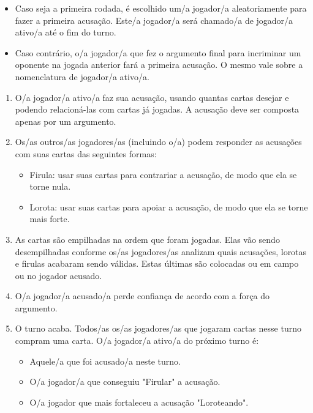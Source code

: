 \documentclass[a4paper, 11pt]{article}
\begin{document}
	\begin{itemize}
		\item Caso seja a primeira rodada, é escolhido um/a jogador/a aleatoriamente para fazer a primeira acusação. Este/a jogador/a será chamado/a de jogador/a ativo/a até o fim do turno.

		\item Caso contrário, o/a jogador/a que fez o argumento final para incriminar um oponente na jogada anterior fará a primeira acusação. O mesmo vale sobre a nomenclatura de jogador/a ativo/a.
	\end{itemize}

	\begin{enumerate}
		\item O/a jogador/a ativo/a faz sua acusação, usando quantas cartas desejar e podendo relacioná-las com cartas já jogadas. A acusação deve ser composta apenas por um argumento.

		\item Os/as outros/as jogadores/as (incluindo o/a) podem responder as acusações com suas cartas das seguintes formas:
			\begin{itemize}
				\item Firula: usar suas cartas para contrariar a acusação, de modo que ela se torne nula.

				\item Lorota: usar suas cartas para apoiar a acusação, de modo que ela se torne mais forte.
			\end{itemize}

		\item As cartas são empilhadas na ordem que foram jogadas. Elas vão sendo desempilhadas conforme os/as jogadores/as analizam quais acusações, lorotas e firulas acabaram sendo válidas. Estas últimas são colocadas ou em campo ou no jogador acusado.

		\item O/a jogador/a acusado/a perde confiança de acordo com a força do argumento.

		\item O turno acaba. Todos/as os/as jogadores/as que jogaram cartas nesse turno compram uma carta. O/a jogador/a ativo/a do próximo turno é:
			 \begin{itemize}
				\item Aquele/a que foi acusado/a neste turno.

				\item O/a jogador/a que conseguiu "Firular" a acusação.

				\item O/a jogador que mais fortaleceu a acusação "Loroteando".
			\end{itemize}

	\end{enumerate}
\end{document}
